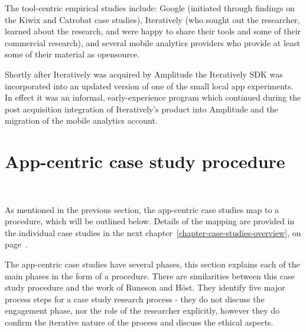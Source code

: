 The tool-centric empirical studies include: Google (initiated through findings on the Kiwix and Catrobat case studies), Iteratively (who sought out the researcher, learned about the research, and were happy to share their tools and some of their commercial research), and several mobile analytics providers who provide at least some of their material as opensource. 

Shortly after Iteratively was acquired by Amplitude the Iteratively SDK was incorporated into an updated version of one of the small local app experiments. In effect it was an informal, early-experience program which continued during the post acquisition integration of Iteratively's product into Amplitude and the migration of the mobile analytics account.


\section{App-centric case study procedure}~\label{methodology-app-centric-case-study-procedure}

As mentioned in the previous section, the app-centric case studies map to a procedure, which will be outlined below. Details of the mapping are provided in the individual case studies in the next chapter~\ref{chapter-case-studies-overview}, on page~\pageref{chapter-case-studies-overview}.

The app-centric case studies have several phases, this section explains each of the main phases in the form of a procedure. 
There are similarities between this case study procedure and the work of Runeson and Höst. They identify five major process steps for a case study research process \citep[pp. 137-138]{runeson_2008_guidelines_for_conducting_and_reporting_case_study_research_in_sw_eng} - they do not discuss the engagement phase, nor the role of the researcher explicitly, however they do confirm the iterative nature of the process and discuss the ethical aspects. %

